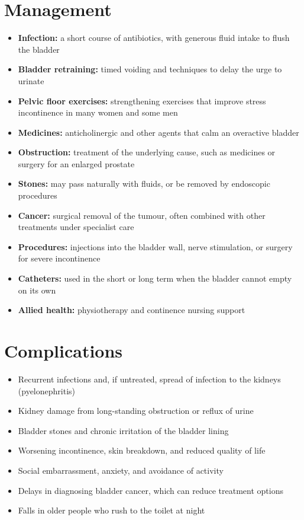 \section*{Management}
\begin{itemize}
    \item \textbf{Infection:} a short course of antibiotics, with generous fluid intake to flush the bladder
    \item \textbf{Bladder retraining:} timed voiding and techniques to delay the urge to urinate
    \item \textbf{Pelvic floor exercises:} strengthening exercises that improve stress incontinence in many women and some men
    \item \textbf{Medicines:} anticholinergic and other agents that calm an overactive bladder
    \item \textbf{Obstruction:} treatment of the underlying cause, such as medicines or surgery for an enlarged prostate
    \item \textbf{Stones:} may pass naturally with fluids, or be removed by endoscopic procedures
    \item \textbf{Cancer:} surgical removal of the tumour, often combined with other treatments under specialist care
    \item \textbf{Procedures:} injections into the bladder wall, nerve stimulation, or surgery for severe incontinence
    \item \textbf{Catheters:} used in the short or long term when the bladder cannot empty on its own
    \item \textbf{Allied health:} physiotherapy and continence nursing support
\end{itemize}

\section*{Complications}
\begin{itemize}
    \item Recurrent infections and, if untreated, spread of infection to the kidneys (pyelonephritis)
    \item Kidney damage from long-standing obstruction or reflux of urine
    \item Bladder stones and chronic irritation of the bladder lining
    \item Worsening incontinence, skin breakdown, and reduced quality of life
    \item Social embarrassment, anxiety, and avoidance of activity
    \item Delays in diagnosing bladder cancer, which can reduce treatment options
    \item Falls in older people who rush to the toilet at night
\end{itemize}

